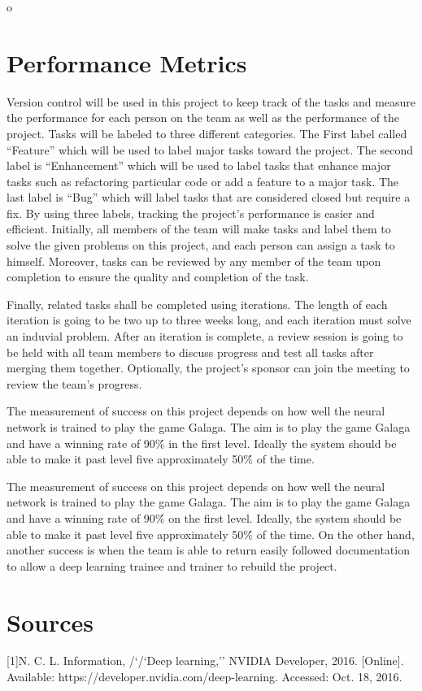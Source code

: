 o\documentclass[letterpaper,10pt]{article}
\begin{document}
\section{Performance Metrics}
Version control will be used in this project to keep track of the tasks and measure the performance for each person on the team as well as the performance of the project.
 Tasks will be labeled to three different categories.
 The First label called “Feature” which will be used to label major tasks toward the project.
 The second label is “Enhancement” which will be used to label tasks that enhance major tasks such as refactoring particular code or add a feature to a major task.
 The last label is “Bug” which will label tasks that are considered closed but require a fix.
 By using three labels, tracking the project’s performance is easier and efficient.
 Initially, all members of the team will make tasks and label them to solve the given problems on this project, and each person can assign a task to himself.
 Moreover, tasks can be reviewed by any member of the team upon completion to ensure the quality and completion of the task.


Finally, related tasks shall be completed using iterations.
 The length of each iteration is going to be two up to three weeks long, and each iteration must solve an induvial problem.
 After an iteration is complete, a review session is going to be held with all team members to discuss progress and test all tasks after merging them together.
 Optionally, the project’s sponsor can join the meeting to review the team's progress.

The measurement of success on this project depends on how well the neural network is trained to play the game Galaga.
The aim is to play the game Galaga and have a winning rate of 90\'\% in the first level.
Ideally the system should be able to make it past level five approximately 50\'\% of the time.

The measurement of success on this project depends on how well the neural network is trained to play the game Galaga. 
The aim is to play the game Galaga and have a winning rate of 90\'\% on the first level.
Ideally, the system should be able to make it past level five approximately 50\'\% of the time.
On the other hand, another success is when the team is able to return easily followed documentation to allow a deep learning trainee and trainer to rebuild the project.
\section{Sources}

[1]N. C. L. Information, /`/`Deep learning,'' NVIDIA Developer, 2016. [Online]. Available: https://developer.nvidia.com/deep-learning. Accessed: Oct. 18, 2016.
\end{document}

